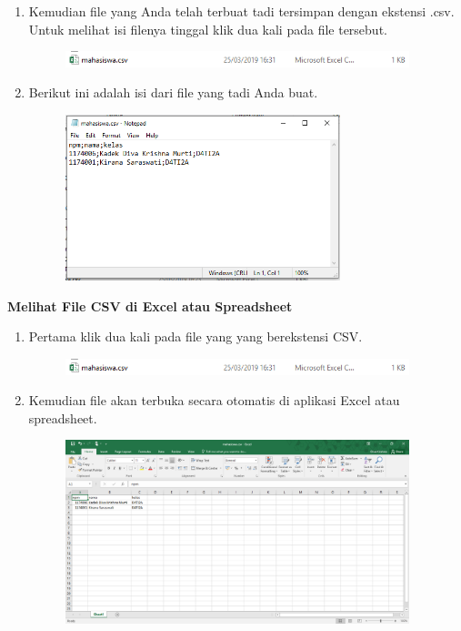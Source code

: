 \begin{enumerate}
\begin{enumerate}
		\item Kemudian file yang Anda telah terbuat tadi tersimpan dengan ekstensi .csv. Untuk melihat isi filenya tinggal klik dua kali pada file tersebut.
		
		\begin{figure}[H]
			\includegraphics[width=10cm]{figures/diva/Chapter4/t8.png}
			\centering
		\end{figure}
		
		\item Berikut ini adalah isi dari file yang tadi Anda buat.
		
		\begin{figure}[H]
			\includegraphics[width=8cm]{figures/diva/Chapter4/t7.png}
			\centering
		\end{figure}
	\end{enumerate}
	
	\textbf{Melihat File CSV di Excel atau Spreadsheet}
	
	\begin{enumerate}
		\item Pertama klik dua kali pada file yang yang berekstensi CSV.
		
		\begin{figure}[H]
			\includegraphics[width=10cm]{figures/diva/Chapter4/t8.png}
			\centering
		\end{figure}
		
		\item Kemudian file akan terbuka secara otomatis di aplikasi Excel atau spreadsheet.
		
		\begin{figure}[H]
			\includegraphics[width=10cm]{figures/diva/Chapter4/t9.png}
			\centering
		\end{figure}
	\end{enumerate}
	

\end{enumerate}
